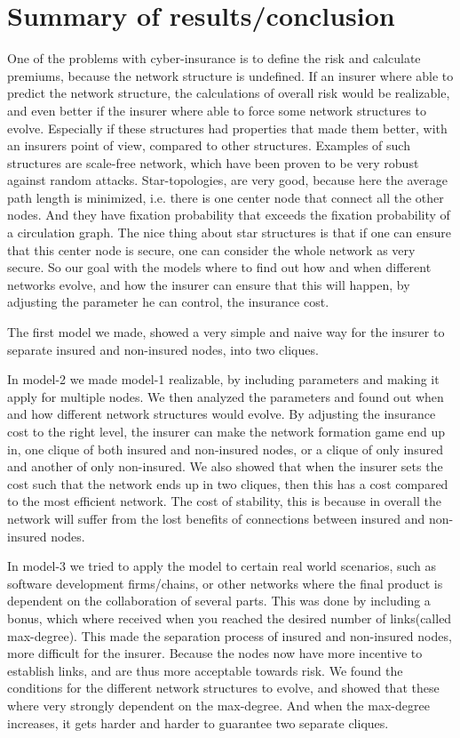 \chapter{Summary of results/conclusion}
One of the problems with cyber-insurance is to define the risk and calculate premiums, because the network structure is undefined. If an insurer where able to predict the network structure, the calculations of overall risk would be realizable, and even better if the insurer where able to force some network structures to evolve. Especially if these structures had properties that made them better, with an insurers point of view, compared to other structures. Examples of such structures are scale-free network, which have been proven to be very robust against random attacks. Star-topologies, are very good, because here the average path length is minimized, i.e. there is one center node that connect all the other nodes. And they have fixation probability that exceeds the fixation probability of a circulation graph. The nice thing about star structures is that if one can ensure that this center node is secure, one can consider the whole network as very secure. 
So our goal with the models where to find out how and when different networks evolve, and how the insurer can ensure that this will happen, by adjusting the parameter he can control, the insurance cost. 

The first model we made, showed a very simple and naive way for the insurer to separate insured and non-insured nodes, into two cliques. 

 In model-2 we made model-1 realizable, by including parameters and making it apply for multiple nodes. We then analyzed the parameters and found out when and how different network structures would evolve. By adjusting the insurance cost to the right level, the insurer can make the network formation game end up in, one clique of both insured and non-insured nodes, or a clique of only insured and another of only non-insured. 
We also showed that when the insurer sets the cost such that the network ends up in two cliques, then this has a cost compared to the most efficient network. The cost of stability, this is because in overall the network will suffer from the lost benefits of connections between insured and non-insured nodes.

In model-3 we tried to apply the model to certain real world scenarios, such as software development firms/chains, or other networks where the final product is dependent on the collaboration of several parts.
This was done by including a bonus, which where received when you reached the desired number of links(called max-degree). This made the separation process of insured and non-insured nodes, more difficult for the insurer. Because the nodes now have more incentive to establish links, and are thus more acceptable towards risk. We found the conditions for the different network structures to evolve, and showed that these where very strongly dependent on the max-degree. And when the max-degree increases, it gets harder and harder to guarantee two separate cliques. 


